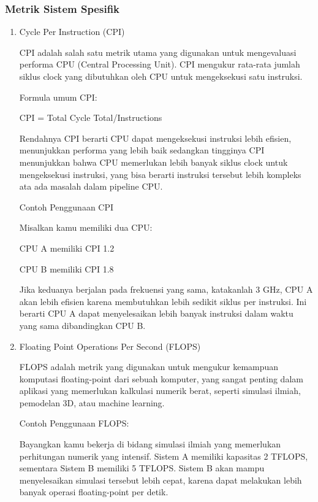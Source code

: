 \documentclass[12pt]{article}
\begin{document}
\subsubsection{Metrik Sistem Spesifik}
\begin{enumerate}
    \item Cycle Per Instruction (CPI)
    \par CPI adalah salah satu metrik utama yang digunakan untuk mengevaluasi performa CPU (Central Processing Unit). CPI mengukur rata-rata jumlah siklus clock yang dibutuhkan oleh CPU untuk mengeksekusi satu instruksi.
    \par Formula umum CPI: 
    \par CPI = Total Cycle Total/Instructions
    \par Rendahnya CPI berarti CPU dapat mengeksekusi instruksi lebih efisien, menunjukkan performa yang lebih baik sedangkan tingginya CPI menunjukkan bahwa CPU memerlukan lebih banyak siklus clock untuk mengeksekusi instruksi, yang bisa berarti instruksi tersebut lebih kompleks ata ada masalah dalam pipeline CPU.
    \par Contoh Penggunaan CPI
    \par Misalkan kamu memiliki dua CPU: 
    \par CPU A memiliki CPI 1.2 
    \par CPU B memiliki CPI 1.8 
    \par Jika keduanya berjalan pada frekuensi yang sama, katakanlah 3 GHz, CPU A akan lebih efisien karena membutuhkan lebih sedikit siklus per instruksi. Ini berarti CPU A dapat menyelesaikan lebih banyak instruksi dalam waktu yang sama dibandingkan CPU B.

    \item Floating Point Operations Per Second (FLOPS)
    \par FLOPS adalah metrik yang digunakan untuk mengukur
    kemampuan komputasi floating-point dari sebuah
    komputer, yang sangat penting dalam aplikasi yang
    memerlukan kalkulasi numerik berat, seperti simulasi
    ilmiah, pemodelan 3D, atau machine learning.
    \par Contoh Penggunaan FLOPS:
    \par Bayangkan kamu bekerja di bidang simulasi ilmiah yang memerlukan perhitungan numerik yang intensif. Sistem A memiliki kapasitas 2 TFLOPS, sementara Sistem B memiliki 5 TFLOPS. Sistem B akan mampu menyelesaikan simulasi tersebut lebih cepat, karena dapat melakukan lebih banyak operasi floating-point per detik.


\end{enumerate}
\end{document}
